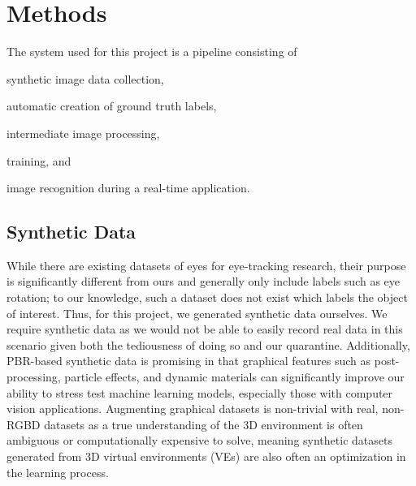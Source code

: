 \section{Methods}

The system used for this project is a pipeline consisting of
\begin{inlist}
\item synthetic image data collection,
\item automatic creation of ground truth labels,
\item intermediate image processing,
\item training, and
\item image recognition during a real-time application.
\end{inlist}

\subsection{Synthetic Data}\label{S:synthetic-generation}

While there are existing datasets of eyes for eye-tracking research, their
purpose is significantly different from ours and generally only include labels
such as eye rotation; to our knowledge, such a dataset does not exist which
labels the object of interest. Thus, for this project, we generated
synthetic data ourselves. We require synthetic data as we would not be able to
easily record real data in this scenario given both the tediousness of doing so
and our quarantine. Additionally, PBR-based synthetic data is promising in that graphical features such as post-processing, particle effects, and dynamic materials can significantly improve our ability to stress test machine learning models, especially those with computer vision applications. Augmenting graphical datasets is non-trivial with real, non-RGBD datasets as a true understanding of the 3D environment is often ambiguous or computationally expensive to solve, meaning synthetic datasets generated from 3D virtual environments (VEs) are also often an optimization in the learning process.

